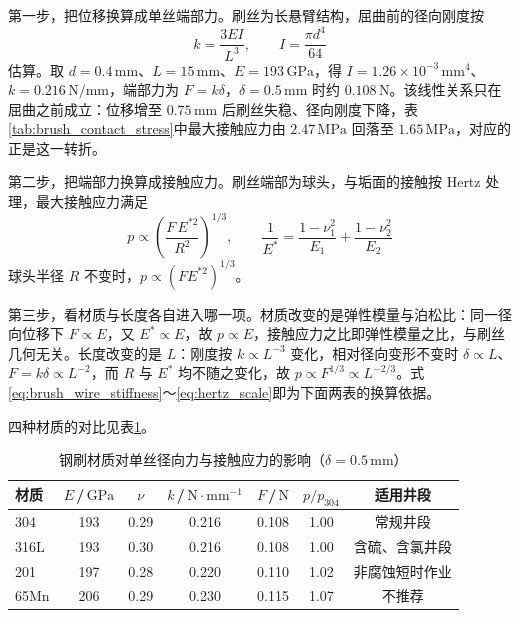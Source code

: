 第一步，把位移换算成单丝端部力。刷丝为长悬臂结构，屈曲前的径向刚度按
\begin{equation}
k=\frac{3EI}{L^{3}},\qquad I=\frac{\pi d^{4}}{64}
\label{eq:brush_wire_stiffness}
\end{equation}
估算。取 $d=0.4\,\mathrm{mm}$、$L=15\,\mathrm{mm}$、$E=193\,\mathrm{GPa}$，得 $I=1.26\times10^{-3}\,\mathrm{mm^{4}}$、$k=0.216\,\mathrm{N/mm}$，端部力为 $F=k\delta$，$\delta=0.5\,\mathrm{mm}$ 时约 $0.108\,\mathrm{N}$。该线性关系只在屈曲之前成立：位移增至 $0.75\,\mathrm{mm}$ 后刷丝失稳、径向刚度下降，表\ref{tab:brush_contact_stress}中最大接触应力由 $2.47\,\mathrm{MPa}$ 回落至 $1.65\,\mathrm{MPa}$，对应的正是这一转折。

第二步，把端部力换算成接触应力。刷丝端部为球头，与垢面的接触按 Hertz 处理，最大接触应力满足
\begin{equation}
p\propto\left(\frac{F\,E^{*2}}{R^{2}}\right)^{1/3},\qquad
\frac{1}{E^{*}}=\frac{1-\nu_{1}^{2}}{E_{1}}+\frac{1-\nu_{2}^{2}}{E_{2}}
\label{eq:hertz_scale}
\end{equation}
球头半径 $R$ 不变时，$p\propto(FE^{*2})^{1/3}$。

第三步，看材质与长度各自进入哪一项。材质改变的是弹性模量与泊松比：同一径向位移下 $F\propto E$，又 $E^{*}\propto E$，故 $p\propto E$，接触应力之比即弹性模量之比，与刷丝几何无关。长度改变的是 $L$：刚度按 $k\propto L^{-3}$ 变化，相对径向变形不变时 $\delta\propto L$、$F=k\delta\propto L^{-2}$，而 $R$ 与 $E^{*}$ 均不随之变化，故 $p\propto F^{1/3}\propto L^{-2/3}$。式\eqref{eq:brush_wire_stiffness}～\eqref{eq:hertz_scale}即为下面两表的换算依据。

四种材质的对比见表\ref{tab:brush_material_compare}。

\begin{table}[H]
	\centering
	\caption{钢刷材质对单丝径向力与接触应力的影响（$\delta=0.5\,\mathrm{mm}$）}
	\label{tab:brush_material_compare}
	\renewcommand{\arraystretch}{1.3}
	\begin{tabular}{lcccccc}
		\toprule
		材质 & $E$\,/\,$\mathrm{GPa}$ & $\nu$ & $k$\,/\,$\mathrm{N\cdot mm^{-1}}$ & $F$\,/\,$\mathrm{N}$ & $p/p_{304}$ & 适用井段 \\
		\midrule
		304 & 193 & 0.29 & 0.216 & 0.108 & 1.00 & 常规井段 \\
		316L & 193 & 0.30 & 0.216 & 0.108 & 1.00 & 含硫、含氯井段 \\
		201 & 197 & 0.28 & 0.220 & 0.110 & 1.02 & 非腐蚀短时作业 \\
		65Mn & 206 & 0.29 & 0.230 & 0.115 & 1.07 & 不推荐 \\
		\bottomrule
	\end{tabular}
\end{table}

